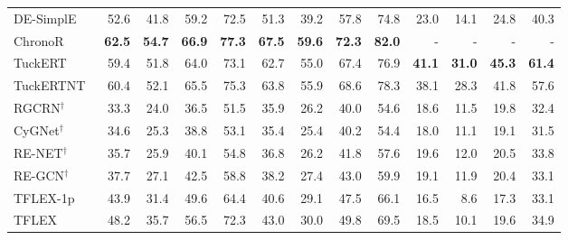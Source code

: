 \begin{table*}[t]
{\begin{tabular}{l rrrr rrrr rrrr}
    DE-SimplE~\cite{DE-SimplE}        & 52.6 & 41.8  & 59.2  & 72.5   & 51.3 & 39.2  & 57.8  & 74.8   & 23.0 & 14.1  & 24.8  & 40.3   \\
    ChronoR~\cite{ChronoR}            & \textbf{62.5} & \textbf{54.7}  & \textbf{66.9}  & \textbf{77.3}   & \textbf{67.5} & \textbf{59.6}  & \textbf{72.3}  & \textbf{82.0}  & -    & -     & -     & -      \\
    \midrule
    TuckERT~\cite{TuckERT}            & 59.4 & 51.8  & 64.0  & 73.1   & 62.7 & 55.0  & 67.4  & 76.9   & \textbf{41.1} & \textbf{31.0}  & \textbf{45.3}  & \textbf{61.4}   \\
    TuckERTNT~\cite{TuckERT}          & 60.4 & 52.1  & 65.5  & 75.3   & 63.8 & 55.9  & 68.6  & 78.3   & 38.1 & 28.3  & 41.8  & 57.6   \\
    \midrule
    RGCRN$^\dagger$~\cite{GCRN,RE-GCN} & 33.3 & 24.0  & 36.5  & 51.5   & 35.9 & 26.2  & 40.0  & 54.6   & 18.6 & 11.5  & 19.8  & 32.4   \\
    CyGNet$^\dagger$~\cite{CyGNet}     & 34.6 & 25.3  & 38.8  & 53.1   & 35.4 & 25.4  & 40.2  & 54.4   & 18.0 & 11.1  & 19.1  & 31.5   \\
    RE-NET$^\dagger$~\cite{RE-NET}     & 35.7 & 25.9  & 40.1  & 54.8   & 36.8 & 26.2  & 41.8  & 57.6   & 19.6 & 12.0  & 20.5  & 33.8   \\
    RE-GCN$^\dagger$~\cite{RE-GCN}     & 37.7 & 27.1  & 42.5  & 58.8   & 38.2 & 27.4  & 43.0  & 59.9   & 19.1 & 11.9  & 20.4  & 33.1   \\
    \midrule
    TFLEX-1p                         & 43.9 & 31.4  & 49.6  & 64.4   & 40.6 & 29.1  & 47.5  & 66.1   & 16.5 & 8.6   & 17.3  & 33.1   \\
    TFLEX                            & 48.2 & 35.7  & 56.5  & 72.3   & 43.0 & 30.0  & 49.8  & 69.5   & 18.5 & 10.1  & 19.6  & 34.9   \\
    \bottomrule
  \end{tabular}
  }
\end{table*}


